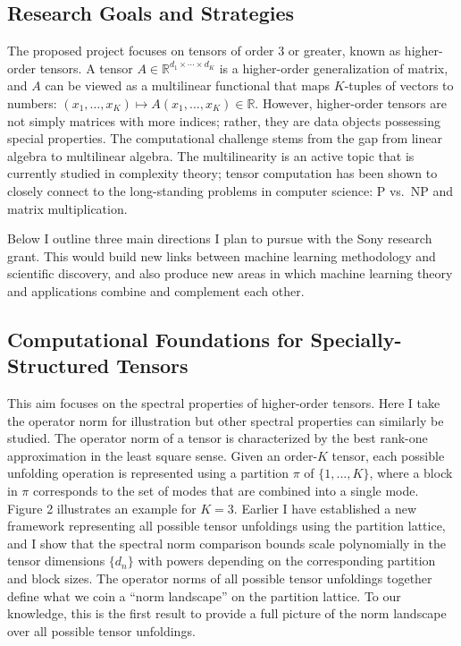 \documentclass[10pt]{article}
\theoremstyle{definition}
\theoremstyle{definition}
\theoremstyle{definition}
\begin{document}
\begin{enumerate}
\section{Research Goals and Strategies} 
The proposed project focuses on tensors of order 3 or greater, known as higher-order tensors. A tensor $A \in  \mathbb{R}^{d_1 \times\cdots \times d_K}$ is a higher-order generalization of matrix, and $A$ can be viewed as a multilinear functional that maps $K$-tuples of vectors to numbers: $(x_1,\ldots,x_K)  \mapsto A(x_1,\ldots,x_K) \in \mathbb{R}$. However, higher-order tensors are not simply matrices with more indices; rather, they are data objects possessing special  properties. The computational challenge stems from the gap from linear algebra to multilinear algebra. The multilinearity is an active topic that is currently studied in complexity theory; tensor computation has been shown to closely connect to the long-standing problems in computer science: P vs.\ NP and matrix multiplication. 

Below I outline three main directions I plan to pursue with the Sony research grant. This would build new links between machine learning methodology and scientific discovery, and also produce new areas in which machine learning theory and applications combine and complement each other. 


\subsection{Computational Foundations for Specially-Structured Tensors} \label{sec:aim1}
This aim focuses on the spectral properties of higher-order tensors. Here I take the operator norm for illustration but other spectral properties can similarly be studied. The operator norm of a tensor is characterized by the best rank-one approximation in the least square sense. Given an order-$K$ tensor, each possible unfolding operation is represented using a partition $\pi$ of $\{1, . . . , K\}$, where a block in $\pi$ corresponds to the set of modes that are combined into a single mode. Figure 2 illustrates an example for $K = 3$. Earlier I have established a new framework representing all possible tensor unfoldings using the partition lattice, and I show that the spectral norm comparison bounds scale polynomially in the tensor dimensions $\{d_n\}$ with powers depending on the corresponding partition and block sizes. The operator norms of all possible tensor unfoldings together define what we coin a ``norm landscape'' on the partition lattice. To our knowledge, this is the first result to provide a full picture of the norm landscape over all possible tensor unfoldings.


\end{enumerate}
\end{document}
